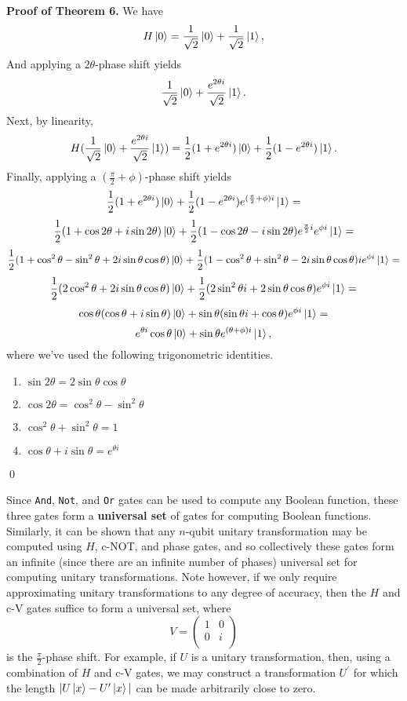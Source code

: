 \documentclass [12pt]{article}
\theoremstyle{definition}
\begin{document}
\textbf{Proof of Theorem 6.} We have
\[H\ket{0} = \frac{1}{\sqrt{2}}\ket{0} + \frac{1}{\sqrt{2}}\ket{1},\]
And applying a $2\theta$-phase shift yields 
\[\frac{1}{\sqrt{2}}\ket{0} + \frac{e^{2\theta i}}{\sqrt{2}}\ket{1}.\]
Next, by linearity,
\[H(\frac{1}{\sqrt{2}}\ket{0} + \frac{e^{2\theta i}}{\sqrt{2}}\ket{1}) = \frac{1}{2}(1+e^{2\theta i})\ket{0} + \frac{1}{2}(1-e^{2\theta i})\ket{1}.\]
Finally, applying a $(\frac{\pi}{2}+\phi)$-phase shift yields
\[\frac{1}{2}(1+e^{2\theta i})\ket{0} + \frac{1}{2}(1-e^{2\theta i})e^{(\frac{\pi}{2}+\phi)i}\ket{1}=\]
\[\frac{1}{2}(1+\cos 2\theta + i\sin 2\theta)\ket{0} + \frac{1}{2}(1-\cos 2\theta - i\sin 2\theta)e^{\frac{\pi}{2}i}e^{\phi i}\ket{1}=\]
\[\frac{1}{2}(1+\cos^2\theta -\sin^2\theta + 2i\sin\theta \cos \theta)\ket{0} + \frac{1}{2}(1-\cos^2\theta +\sin^2\theta - 2i\sin \theta\cos\theta)i e^{\phi i}\ket{1}=\]
\[\frac{1}{2}(2\cos^2\theta  + 2i\sin\theta \cos\theta)\ket{0} + \frac{1}{2}(2\sin^2\theta i  + 2\sin \theta\cos\theta) e^{\phi i}\ket{1}=\]
\[\cos\theta(\cos\theta  + i\sin\theta)\ket{0} + \sin\theta(\sin\theta i  + \cos\theta) e^{\phi i}\ket{1}=\]
\[e^{\theta i}\cos\theta\ket{0} + \sin\theta e^{(\theta+\phi) i}\ket{1},\]
where we've used the following trigonometric identities.
\begin{enumerate}
\item $\sin 2\theta  = 2\sin\theta \cos\theta$
\item $\cos 2\theta  = \cos^2\theta - \sin^2\theta$
\item $\cos^2\theta + \sin^2\theta = 1$
\item $\cos\theta  + i\sin\theta = e^{\theta i}$
\end{enumerate}
\qed

Since \texttt{And}, \texttt{Not}, and \texttt{Or} gates can be used to compute any Boolean function, these three gates form a \textbf{universal set} of gates for computing Boolean functions.
Similarly, it can be shown that any $n$-qubit unitary transformation may be computed using $H$, c-NOT, and phase gates, and so collectively these gates form an infinite (since there are an infinite number of phases)  universal set for computing unitary transformations. Note however, if we only require approximating unitary transformations to any degree of accuracy, then the $H$ and c-V gates suffice to form a universal set, where
\[V=
\left(\begin{array}{cc}
1 & 0\\
0 &  i \\
\end{array}\right)
\]
is the $\frac{\pi}{2}$-phase shift.
For example, if $U$ is a unitary transformation, then, using a combination of $H$ and c-V gates, we may construct a transformation $U^{\prime}$ for which the length
$|U\ket{x}-U^{\prime}\ket{x}|$ can be made arbitrarily close to zero.
\end{document}

